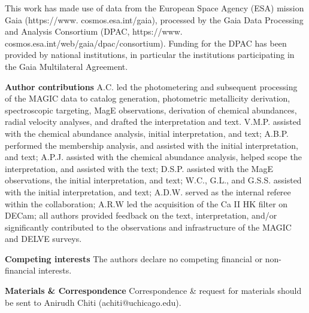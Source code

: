 \documentclass[pdflatex,sn-nature]{sn-jnl}%
\theoremstyle{thmstyleone}%
\theoremstyle{thmstyletwo}%
\theoremstyle{thmstylethree}%
\begin{document}
This work has made use of data from the European Space Agency (ESA) mission Gaia (https://www. cosmos.esa.int/gaia), processed by the Gaia Data Processing and Analysis Consortium (DPAC, https://www. cosmos.esa.int/web/gaia/dpac/consortium). Funding for the DPAC has been provided by national institutions, in particular the institutions participating in the Gaia Multilateral Agreement. 


\noindent\textbf{Author contributions} A.C. led the photometering and subsequent processing of the MAGIC data to catalog generation, photometric metallicity derivation, spectroscopic targeting, MagE observations, derivation of chemical abundances, radial velocity analyses, and drafted the interpretation and text. V.M.P. assisted with the chemical abundance analysis, initial interpretation, and text; A.B.P. performed the membership analysis, and assisted with the initial interpretation, and text; A.P.J. assisted with the chemical abundance analysis, helped scope the interpretation, and assisted with the text; D.S.P. assisted with the MagE observations, the initial interpretation, and text; W.C., G.L., and G.S.S. assisted with the initial interpretation, and text; A.D.W. served as the internal referee within the collaboration; A.R.W led the acquisition of the Ca II HK filter on DECam; all authors provided feedback on the text, interpretation, and/or significantly contributed to the observations and infrastructure of the MAGIC and DELVE surveys. 

\noindent\textbf{Competing interests} The authors declare no competing financial or non-financial interests.

\noindent\textbf{Materials \& Correspondence}
Correspondence \& request for materials should be sent to Anirudh Chiti (achiti@uchicago.edu). 


\end{document}
